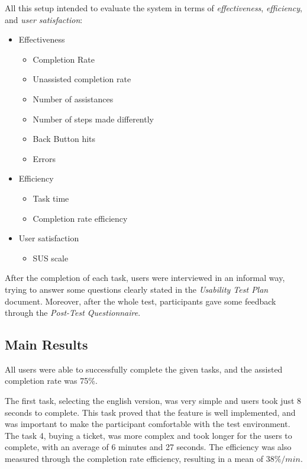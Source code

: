 \documentclass[a4paper]{article}
\begin{document}
All this setup intended to evaluate the system in terms of \emph{effectiveness}, \emph{efficiency}, and \emph{user satisfaction}:
 
 \begin{itemize}
   \item Effectiveness
   \begin{itemize}
     \item Completion Rate
     \item Unassisted completion rate
     \item Number of assistances
     \item Number of steps made differently
     \item Back Button hits
     \item Errors
   \end{itemize}
   \item Efficiency
   \begin{itemize}
     \item Task time
     \item Completion rate efficiency
   \end{itemize}
   \item User satisfaction
   \begin{itemize}
     \item SUS scale
   \end{itemize}
 \end{itemize}
 
 After the completion of each task, users were interviewed in an informal way, trying to answer some questions clearly stated in the \emph{Usability Test Plan} document. Moreover, after the whole test, participants gave some feedback through the \emph{Post-Test Questionnaire}.
 
 
 \subsection{Main Results}
All users were able to successfully complete the given tasks, and the assisted completion rate was 75\%.

The first task, selecting the english version, was very simple and users took just 8 seconds to complete. This task proved that the feature is well implemented, and was important to make the participant comfortable with the test environment. The task 4, buying a ticket, was more complex and took longer for the users to complete, with an average of 6 minutes and 27 seconds. The efficiency was also measured through the completion rate efficiency, resulting in a mean of $38\%/min$.
\end{document}
